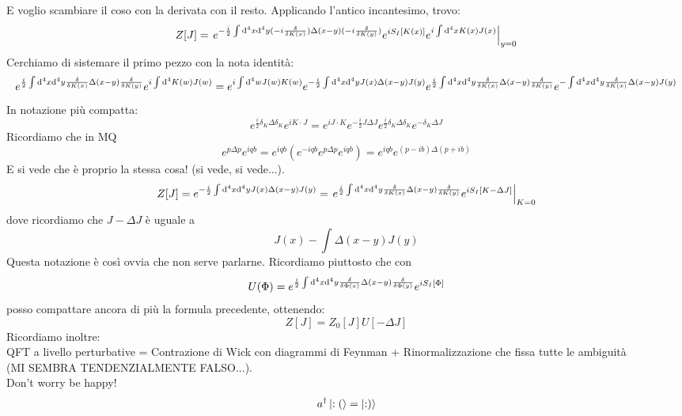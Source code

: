 \documentclass[a4paper, 11pt]{article}
\begin{document}
	E voglio scambiare il coso con la derivata con il resto. Applicando l'antico incantesimo, trovo:
	\[Z[J] = \left. e^{-\frac{i}{2} \int \mathrm{d}^4x \mathrm{d}^4y (-i\frac{\delta}{\delta K(x)}) \Delta(x-y) (-i\frac{\delta}{\delta K(y)})} e^{iS_I[K(x)]}e^{i\int \mathrm{d}^4x K(x)J(x)}\right|_{y=0}\]
	Cerchiamo di sistemare il primo pezzo con la nota identità:
	\[e^{\frac{i}{2}\int \mathrm{d}^4x \mathrm{d}^4y \frac{\delta}{\delta K(x)} \Delta(x-y) \frac{\delta}{\delta K(y)}} e^{i\int \mathrm{d}^4 K(w)J(w)} = e^{i\int \mathrm{d}^4w J(w)K(w)} e^{-\frac{i}{2}\int \mathrm{d}^4x \mathrm{d}^4y J(x)\Delta(x-y)J(y)} e^{\frac{i}{2}\int \mathrm{d}^4x \mathrm{d}^4y \frac{\delta}{\delta K(x)} \Delta(x-y) \frac{\delta}{\delta K(y)}} e^{-\int \mathrm{d}^4x \mathrm{d}^4y \frac{\delta}{\delta K(x)} \Delta(x-y) J(y)}\]
	In notazione più compatta:
	\[e^{\frac{i}{2} \delta_K \Delta \delta_K} e^{iK \cdot J} = e^{iJ \cdot K}e^{-\frac{i}{2}J\Delta J}e^{\frac{i}{2}\delta_K \Delta \delta_K} e^{-\delta_K \Delta J}\]
	Ricordiamo che in MQ
	\[e^{p\Delta p}e^{iqb} = e^{iqb} (e^{-iqb}e^{p\Delta p}e^{iqb}) = e^{iqb} e^{(p-ib)\Delta(p+ib)} \]
	E si vede che è proprio la stessa cosa! (si vede, si vede...).
	\[Z[J]= e^{-\frac{i}{2}\int \mathrm{d}^4 x \mathrm{d}^4 y J(x) \Delta(x-y) J(y)} = \left. e^{\frac{i}{2}\int \mathrm{d}^4 x \mathrm{d}^4 y \frac{\delta}{\delta K(x)} \Delta(x-y) \frac{\delta}{\delta K(y)}}e^{iS_I[K-\Delta J]} \right|_{K=0}\]
	dove ricordiamo che $J-\Delta J$ è uguale a
	\[J(x) - \int \Delta(x-y)J(y)\]
	Questa notazione è così ovvia che non serve parlarne.
	Ricordiamo piuttosto che con
	\[U(\Phi) = e^{\frac{i}{2}\int \mathrm{d}^4x \mathrm{d}^4y \frac{\delta}{\delta \Phi(x)}\Delta(x-y)\frac{\delta}{\delta \Phi(y)}} e^{iS_I[\Phi]}\]
	posso compattare ancora di più la formula precedente, ottenendo:
	\[Z[J] = Z_0[J] U[-\Delta J]\]
	Ricordiamo inoltre:\\
	QFT a livello perturbative = Contrazione di Wick con diagrammi di Feynman + Rinormalizzazione che fissa tutte le ambiguità\\
	(MI SEMBRA TENDENZIALMENTE FALSO...).\\
	
	
	
	\noindent Don't worry be happy!\\
	\[a^\dagger \left| :(\right\rangle = \left| :)\right\rangle\]
	
	
	\newpage
	
\end{document}

